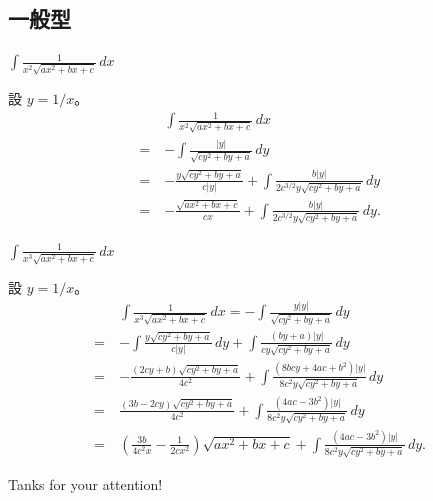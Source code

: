\documentclass{beamer}
\theoremstyle{remark}
\begin{document}
\begin{CJK}{UTF8}{bsmi}
\subsection{一般型}
\begin{frame}{$\displaystyle \int \frac{1}{x^2 \sqrt{ax^2 + bx + c}}\,dx$}
  \begin{solution}
    設 $y = 1/x$。
    \begin{align*}
	 & \int \frac{1}{x^2 \sqrt{ax^2 + bx + c}}\,dx\\
      =\:& -\int \frac{|y|}{\sqrt{cy^2 + by + a}}\,dy\\
      =\:& -\frac{y \sqrt{cy^2 + by + a}}{c \left| y \right|} + \int \frac{b \left| y \right|}
	   {2c^{3/2}y \sqrt{cy^2 + by + a}}\,dy\\
      =\:& -\frac{\sqrt{ax^2 + bx + c}}{cx} + \int \frac{b \left| y \right|} {2c^{3/2}y \sqrt{cy^2 + by + a}}\,dy.
    \end{align*}
  \end{solution}
\end{frame}

\begin{frame}{$\displaystyle \int \frac{1}{x^3 \sqrt{ax^2 + bx + c}}\,dx$}
  \begin{solution}
    設 $y = 1/x$。
    \small
    \begin{align*}
	 & \int \frac{1}{x^3 \sqrt{ax^2 + bx + c}}\,dx = -\int \frac{y \left| y \right|}{\sqrt{cy^2 + by + a}}\,dy\\
      =\:& -\int \frac{y \sqrt{cy^2 + by + a}}{c \left| y \right|}\,dy + \int \frac{\left( by + a \right) |y|}
	   {cy \sqrt{cy^2 + by + a}}\,dy\\
      =\:& -\frac{\left( 2cy + b \right) \sqrt{cy^2 + by + a}}{4c^2} + \int \frac{\left( 8bcy + 4ac + b^2 \right) |y|}
	   {8c^2 y \sqrt{cy^2 + by + a}}\,dy\\
      =\:& \frac{\left( 3b - 2cy \right) \sqrt{cy^2 + by + a}}{4c^2} + \int \frac{\left( 4ac - 3b^2 \right) |y|}
	   {8c^2 y \sqrt{cy^2 + by + a}}\,dy\\
      =\:& \left( \frac{3b}{4c^2 x} - \frac{1}{2cx^2} \right) \sqrt{ax^2 + bx + c} + \int \frac{\left( 4ac - 3b^2 \right) |y|}
	   {8c^2 y \sqrt{cy^2 + by + a}}\,dy.
    \end{align*}
  \end{solution}
\end{frame}

\begin{frame}
  \begin{center}
    \huge Tanks for your attention!
  \end{center}
\end{frame}
\end{CJK}
\end{document}
